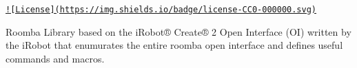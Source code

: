 \href{http://creativecommons.org/publicdomain/zero/1.0/}{\tt !\mbox{[}License\mbox{]}(https\+://img.\+shields.\+io/badge/license-\/\+C\+C0-\/000000.\+svg)}

Roomba Library based on the i\+Robot® Create® 2 Open Interface (O\+I) written by the i\+Robot that enumurates the entire roomba open interface and defines useful commands and macros. 